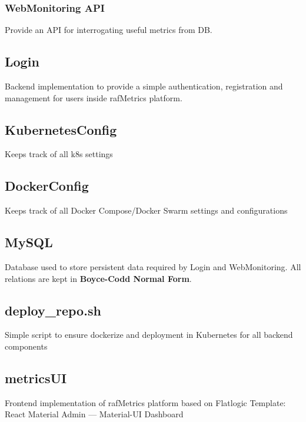 \subsubsection{WebMonitoring API}
Provide an API for interrogating useful metrics from DB.

\subsection{Login}
Backend implementation to provide a simple authentication, registration and management for users inside rafMetrics platform.

\subsection{KubernetesConfig}
Keeps track of all k8s settings

\subsection{DockerConfig}
Keeps track of all Docker Compose/Docker Swarm settings and configurations

\subsection{MySQL}
Database used to store persistent data required by Login and WebMonitoring.
All relations are kept in \textbf{Boyce-Codd Normal Form}.

\subsection{deploy\_repo.sh}
Simple script to ensure dockerize and deployment in Kubernetes for all backend components

\subsection{metricsUI}
Frontend implementation of rafMetrics platform based on Flatlogic Template: React Material Admin — Material-UI Dashboard
